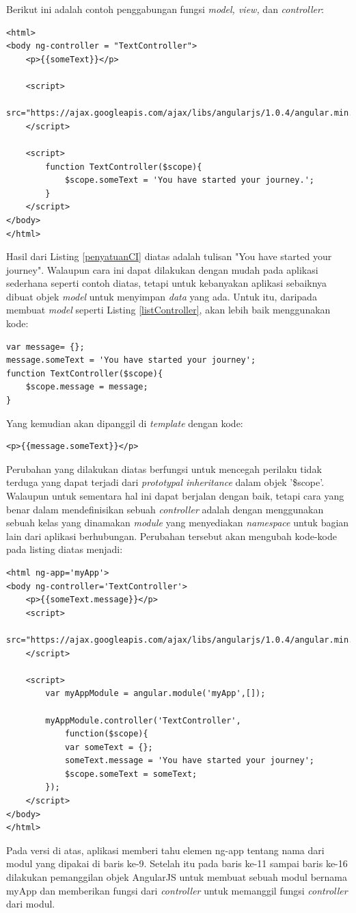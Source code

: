 	Berikut ini adalah contoh penggabungan fungsi \textit{model, view,} dan \textit{controller}:
\begin{lstlisting}[caption= Penyatuan model view controller , label=penyatuanCI]
<html>
<body ng-controller = "TextController">
	<p>{{someText}}</p>
	
	<script>
		src="https://ajax.googleapis.com/ajax/libs/angularjs/1.0.4/angular.min.js">
	</script>
	
	<script>
		function TextController($scope){
			$scope.someText = 'You have started your journey.';
		}
	</script>
</body>
</html>
\end{lstlisting}
	
	Hasil dari Listing \ref{penyatuanCI} diatas adalah tulisan "You have started your journey". Walaupun cara ini dapat dilakukan dengan mudah pada aplikasi sederhana seperti contoh diatas, tetapi untuk kebanyakan aplikasi sebaiknya dibuat objek \textit{model} untuk menyimpan \textit{data} yang ada. Untuk itu, daripada membuat \textit{model} seperti Listing \ref{listController}, akan lebih baik menggunakan kode:
\begin{lstlisting}[caption= Penyederhanaan controller]
var message= {};
message.someText = 'You have started your journey';
function TextController($scope){
	$scope.message = message;
}
\end{lstlisting}
	Yang kemudian akan dipanggil di \textit{template} dengan kode:
\begin{lstlisting}[caption= Pemanggilan variabel]
<p>{{message.someText}}</p>
\end{lstlisting}
	Perubahan yang dilakukan diatas berfungsi untuk mencegah perilaku tidak terduga yang dapat terjadi dari \textit{prototypal inheritance} dalam objek '\$scope'. Walaupun untuk sementara hal ini dapat berjalan dengan baik, tetapi cara yang benar dalam mendefinisikan sebuah \textit{controller} adalah dengan menggunakan sebuah kelas yang dinamakan \textit{module} yang menyediakan \textit{namespace} untuk bagian lain dari aplikasi berhubungan. Perubahan tersebut akan mengubah kode-kode pada listing diatas menjadi:
	\begin{lstlisting}[caption= Penyederhanaan MVC]
<html ng-app='myApp'>
<body ng-controller='TextController'>
	<p>{{someText.message}}</p>
	<script>
		src="https://ajax.googleapis.com/ajax/libs/angularjs/1.0.4/angular.min.js">
	</script>
	
	<script>
		var myAppModule = angular.module('myApp',[]);
		
		myAppModule.controller('TextController',
			function($scope){
			var someText = {};
			someText.message = 'You have started your journey';
			$scope.someText = someText;
		});
	</script>
</body>
</html>
	\end{lstlisting}
	Pada versi di atas, aplikasi memberi tahu elemen ng-app tentang nama dari modul yang dipakai di baris ke-9. Setelah itu pada baris ke-11 sampai baris ke-16 dilakukan pemanggilan objek AngularJS untuk membuat sebuah modul bernama myApp dan memberikan fungsi dari \textit{controller} untuk memanggil fungsi \textit{controller} dari modul.
	
